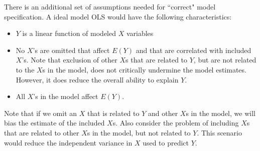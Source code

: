 \documentclass[11pt,openany]{book}\usepackage[]{graphicx}\usepackage[]{color}
\begin{document}
\begin{grbox}
\end{grbox}
  

There is an additional set of assumptions needed for ``correct" model specification. A ideal model OLS would have the following characteristics: 
\begin{itemize}
\item $Y$ is a linear function of modeled $X$ variables
\item No $X$'s are omitted that affect $E(Y)$ and that are correlated with included $X$'s. Note that exclusion of other $X$s that are related to $Y$, but are not related to the $X$s in the model, does not critically undermine the model estimates. However, it does reduce the overall ability to explain $Y$. 
\item All $X$'s in the model affect $E(Y)$.  
\end{itemize}
Note that if we omit an $X$ that is related to $Y$ and other $X$s in the model, we will bias the estimate of the included $X$s.  Also consider the problem of including $X$s that are related to other $X$s in the model, but not related  to $Y$. This scenario would reduce the independent variance in $X$ used to predict $Y$.
\end{document}
